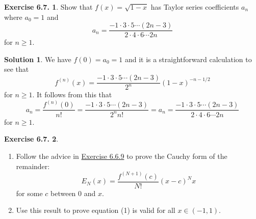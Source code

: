 \documentclass[12pt]{article}
\theoremstyle{definition}
\theoremstyle{exercise}
\newtheorem{exercise}{Exercise 6.7.}
\theoremstyle{solution}
\newtheorem*{solution}{Solution}
\begin{document}
\begin{exercise}
\label{ex:4}
    Show that \( f(x) = \sqrt{1 - x} \) has Taylor series coefficients \( a_n \) where \( a_0 = 1 \) and
    \[
        a_n = \frac{-1 \cdot 3 \cdot 5 \cdots (2n - 3)}{2 \cdot 4 \cdot 6 \cdots 2n}
    \]
    for \( n \geq 1 \).
\end{exercise}

\begin{solution}
    We have \( f(0) = a_0 = 1 \) and it is a straightforward calculation to see that
    \[
        f^{(n)}(x) = \frac{-1 \cdot 3 \cdot 5 \cdots (2n - 3)}{2^n} (1 - x)^{-n - 1/2}
    \]
    for \( n \geq 1 \). It follows from this that
    \[
        a_n = \frac{f^{(n)}(0)}{n!} = \frac{-1 \cdot 3 \cdot 5 \cdots (2n - 3)}{2^n n!} = a_n = \frac{-1 \cdot 3 \cdot 5 \cdots (2n - 3)}{2 \cdot 4 \cdot 6 \cdots 2n}
    \]
    for \( n \geq 1 \).
\end{solution}

\begin{exercise}
\label{ex:5}
    \begin{enumerate}
        \item Follow the advice in \href{https://lew98.github.io/Mathematics/UA_Section_6_6_Exercises.pdf}{Exercise 6.6.9} to prove the Cauchy form of the remainder:
        \[
            E_N(x) = \frac{f^{(N + 1)}(c)}{N!} (x - c)^N x
        \]
        for some \( c \) between 0 and \( x \).

        \item Use this result to prove equation (1) is valid for all \( x \in (-1, 1) \).
    \end{enumerate}
\end{exercise}
\end{document}
